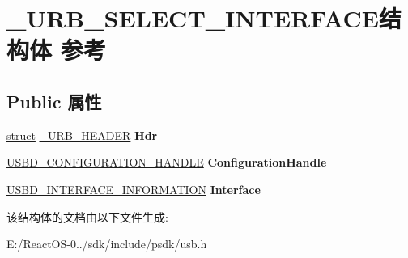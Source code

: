 \hypertarget{struct___u_r_b___s_e_l_e_c_t___i_n_t_e_r_f_a_c_e}{}\section{\+\_\+\+U\+R\+B\+\_\+\+S\+E\+L\+E\+C\+T\+\_\+\+I\+N\+T\+E\+R\+F\+A\+C\+E结构体 参考}
\label{struct___u_r_b___s_e_l_e_c_t___i_n_t_e_r_f_a_c_e}
\subsection*{Public 属性}
\begin{DoxyCompactItemize}
\item 
\mbox{\label{struct___u_r_b___s_e_l_e_c_t___i_n_t_e_r_f_a_c_e_a00b34d1cb2a037e044d4f3db8e1d632e}} 
\hyperlink{interfacestruct}{struct} \hyperlink{struct___u_r_b___h_e_a_d_e_r}{\+\_\+\+U\+R\+B\+\_\+\+H\+E\+A\+D\+ER} {\bfseries Hdr}
\item 
\mbox{\label{struct___u_r_b___s_e_l_e_c_t___i_n_t_e_r_f_a_c_e_ae791a1c847ee0f33b927021213b00de6}} 
\hyperlink{interfacevoid}{U\+S\+B\+D\+\_\+\+C\+O\+N\+F\+I\+G\+U\+R\+A\+T\+I\+O\+N\+\_\+\+H\+A\+N\+D\+LE} {\bfseries Configuration\+Handle}
\item 
\mbox{\label{struct___u_r_b___s_e_l_e_c_t___i_n_t_e_r_f_a_c_e_acf216f2f48563da4f7215ccbe1295fec}} 
\hyperlink{struct___u_s_b_d___i_n_t_e_r_f_a_c_e___i_n_f_o_r_m_a_t_i_o_n}{U\+S\+B\+D\+\_\+\+I\+N\+T\+E\+R\+F\+A\+C\+E\+\_\+\+I\+N\+F\+O\+R\+M\+A\+T\+I\+ON} {\bfseries Interface}
\end{DoxyCompactItemize}


该结构体的文档由以下文件生成\+:\begin{DoxyCompactItemize}
\item 
E\+:/\+React\+O\+S-\/0../sdk/include/psdk/usb.\+h\end{DoxyCompactItemize}
